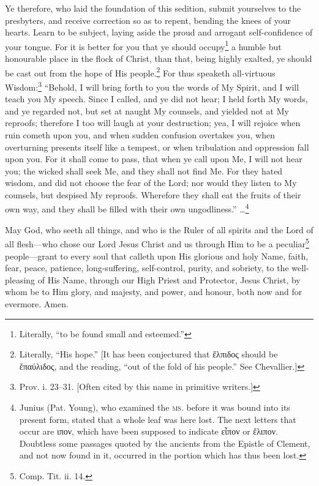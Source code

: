 Ye therefore, who laid the foundation of this sedition, submit yourselves to the presbyters, and receive correction so as to repent, bending the knees of your hearts. Learn to be subject, laying aside the proud and arrogant self-confidence of your tongue. For it is better for you that ye should occupy\footnote{Literally, “to be found small and esteemed.”} a humble but honourable place in the flock of Christ, than that, being highly exalted, ye should be cast out from the hope of His people.\footnote{Literally, “His hope.” [It has been conjectured that \textgreek{ἔλπιδος} should be \textgreek{ἔπαύλιδος}, and the reading, “out of the fold of his people.” See Chevallier.]} For thus speaketh all-virtuous Wisdom:\footnote{Prov. i. 23–31. [Often cited by this name in primitive writers.]} “Behold, I will bring forth to you the words of My Spirit, and I will teach you My speech. Since I called, and ye did not hear; I held forth My words, and ye regarded not, but set at naught My counsels, and yielded not at My reproofs; therefore I too will laugh at your destruction; yea, I will rejoice when ruin cometh upon you, and when sudden confusion overtakes you, when overturning presents itself like a tempest, or when tribulation and oppression fall upon you. For it shall come to pass, that when ye call upon Me, I will not hear you; the wicked shall seek Me, and they shall not find Me. For they hated wisdom, and did not choose the fear of the Lord; nor would they listen to My counsels, but despised My reproofs. Wherefore they shall eat the fruits of their own way, and they shall be filled with their own ungodliness.” …\footnote{Junius (Pat. Young), who examined the \textsc{ms.} before it was bound into its present form, stated that a whole leaf was here lost. The next letters that occur are \textgreek{ιπον}, which have been supposed to indicate \textgreek{εἶπον} or \textgreek{ἔλιπον}. Doubtless some passages quoted by the ancients from the Epistle of Clement, and not now found in it, occurred in the portion which has thus been lost.}


May God, who seeth all things, and who is the Ruler of all spirits and the Lord of all flesh—who chose our Lord Jesus Christ and us through Him to be a peculiar\footnote{Comp. Tit. ii. 14.} people—grant to every soul that calleth upon His glorious and holy Name, faith, fear, peace, patience, long-suffering, self-control, purity, and sobriety, to the well-pleasing of His Name, through our High Priest and Protector, Jesus Christ, by whom be to Him glory, and majesty, and power, and honour, both now and for evermore. Amen.

